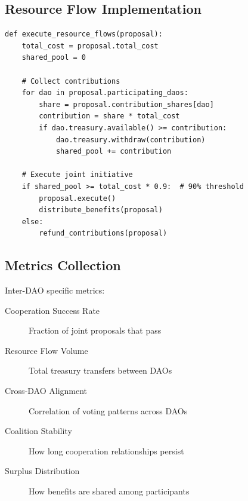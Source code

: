 \subsection{Resource Flow Implementation}

\begin{lstlisting}[caption=Resource flow execution (pseudocode)]
def execute_resource_flows(proposal):
    total_cost = proposal.total_cost
    shared_pool = 0

    # Collect contributions
    for dao in proposal.participating_daos:
        share = proposal.contribution_shares[dao]
        contribution = share * total_cost
        if dao.treasury.available() >= contribution:
            dao.treasury.withdraw(contribution)
            shared_pool += contribution

    # Execute joint initiative
    if shared_pool >= total_cost * 0.9:  # 90% threshold
        proposal.execute()
        distribute_benefits(proposal)
    else:
        refund_contributions(proposal)
\end{lstlisting}

\subsection{Metrics Collection}

Inter-DAO specific metrics:

\begin{description}
    \item[Cooperation Success Rate] Fraction of joint proposals that pass
    \item[Resource Flow Volume] Total treasury transfers between DAOs
    \item[Cross-DAO Alignment] Correlation of voting patterns across DAOs
    \item[Coalition Stability] How long cooperation relationships persist
    \item[Surplus Distribution] How benefits are shared among participants
\end{description}
